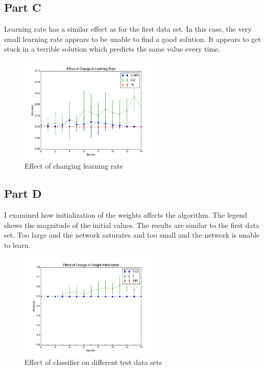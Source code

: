 \subsection{Part C}
Learning rate has a similar effect as for the first data set.  In this case, the very small learning rate appears to be unable to find a good solution.  It appears to get stuck in a terrible solution which predicts the same value every time.  
\begin{figure}[H]
	\centering
	\includegraphics[width=0.6\textwidth]{../train2/learning_rate.png}
	\caption{Effect of changing learning rate}
\end{figure}

\subsection{Part D}
I examined how initialization of the weights affects the algorithm.  The legend shows the magnitude of the initial values.  The results are similar to the first data set.  Too large and the network saturates and too small and the network is unable to learn. 
\begin{figure}[h]
	\centering
	\includegraphics[width=0.6\textwidth]{../train2/weights.png}
	\caption{Effect of classifier on different test data sets}
\end{figure}

